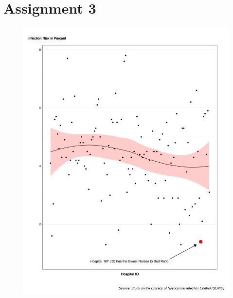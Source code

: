 \documentclass[11pt]{article}
\begin{document}
\section{Assignment 3}

\begin{figure}[H]
  \centering
   \includegraphics[scale=0.5]{Assignment_3.pdf}
\end{figure}
\end{document}
